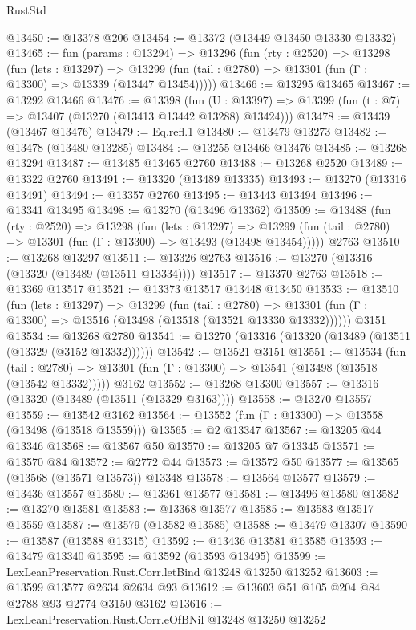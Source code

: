 \begin{lexlean}{RustStd}
\begin{coremodule}
@13450 := @13378 @206
@13454 := @13372 (@13449 @13450 @13330 @13332)
@13465 := fun (params : @13294) =>
  @13296
    (fun (rty : @2520) =>
    @13298
      (fun (lets : @13297) =>
      @13299 (fun (tail : @2780) => @13301 (fun (Γ : @13300) => @13339 (@13447 @13454)))))
@13466 := @13295 @13465
@13467 := @13292 @13466
@13476 := @13398
    (fun (U : @13397) => @13399 (fun (t : @7) => @13407 (@13270 (@13413 @13442 @13288) @13424)))
@13478 := @13439 (@13467 @13476)
@13479 := Eq.refl.{1}
@13480 := @13479 @13273
@13482 := @13478 (@13480 @13285)
@13484 := @13255 @13466 @13476
@13485 := @13268 @13294
@13487 := @13485 @13465 @2760
@13488 := @13268 @2520
@13489 := @13322 @2760
@13491 := @13320 (@13489 @13335)
@13493 := @13270 (@13316 @13491)
@13494 := @13357 @2760
@13495 := @13443 @13494
@13496 := @13341 @13495
@13498 := @13270 (@13496 @13362)
@13509 := @13488
    (fun (rty : @2520) =>
    @13298
      (fun (lets : @13297) =>
      @13299 (fun (tail : @2780) => @13301 (fun (Γ : @13300) => @13493 (@13498 @13454)))))
    @2763
@13510 := @13268 @13297
@13511 := @13326 @2763
@13516 := @13270 (@13316 (@13320 (@13489 (@13511 @13334))))
@13517 := @13370 @2763
@13518 := @13369 @13517
@13521 := @13373 @13517 @13448 @13450
@13533 := @13510
    (fun (lets : @13297) =>
    @13299
      (fun (tail : @2780) =>
      @13301 (fun (Γ : @13300) => @13516 (@13498 (@13518 (@13521 @13330 @13332))))))
    @3151
@13534 := @13268 @2780
@13541 := @13270 (@13316 (@13320 (@13489 (@13511 (@13329 (@3152 @13332))))))
@13542 := @13521 @3151
@13551 := @13534
    (fun (tail : @2780) => @13301 (fun (Γ : @13300) => @13541 (@13498 (@13518 (@13542 @13332)))))
    @3162
@13552 := @13268 @13300
@13557 := @13316 (@13320 (@13489 (@13511 (@13329 @3163))))
@13558 := @13270 @13557
@13559 := @13542 @3162
@13564 := @13552 (fun (Γ : @13300) => @13558 (@13498 (@13518 @13559)))
@13565 := @2 @13347
@13567 := @13205 @44 @13346
@13568 := @13567 @50
@13570 := @13205 @7 @13345
@13571 := @13570 @84
@13572 := @2772 @44
@13573 := @13572 @50
@13577 := @13565 (@13568 (@13571 @13573)) @13348
@13578 := @13564 @13577
@13579 := @13436 @13557
@13580 := @13361 @13577
@13581 := @13496 @13580
@13582 := @13270 @13581
@13583 := @13368 @13577
@13585 := @13583 @13517 @13559
@13587 := @13579 (@13582 @13585)
@13588 := @13479 @13307
@13590 := @13587 (@13588 @13315)
@13592 := @13436 @13581 @13585
@13593 := @13479 @13340
@13595 := @13592 (@13593 @13495)
@13599 := LexLeanPreservation.Rust.Corr.letBind @13248 @13250 @13252
@13603 := @13599 @13577 @2634 @2634 @93
@13612 := @13603 @51 @105 @204 @84 @2788 @93 @2774 @3150 @3162
@13616 := LexLeanPreservation.Rust.Corr.eOfBNil @13248 @13250 @13252

\end{coremodule}
\end{lexlean}
